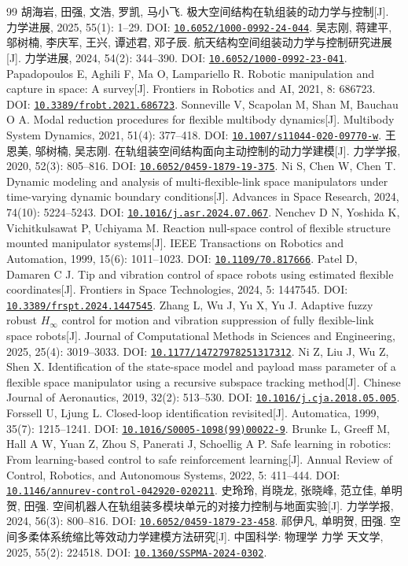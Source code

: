 \documentclass[UTF8,a4paper,zihao=-4,fontset=fandol]{ctexart}
\newcommand{\doi}[1]{\href{https://doi.org/#1}{\nolinkurl{#1}}}
\begin{document}
\begingroup
\small
{}
\renewcommand{\refname}{主要参考文献}
\begin{thebibliography}{99}
\setlength{\itemsep}{0.3em}
 胡海岩, 田强, 文浩, 罗凯, 马小飞. 极大空间结构在轨组装的动力学与控制[J]. 力学进展, 2025, 55(1): 1--29. DOI: \doi{10.6052/1000-0992-24-044}.
 吴志刚, 蒋建平, 邬树楠, 李庆军, 王兴, 谭述君, 邓子辰. 航天结构空间组装动力学与控制研究进展[J]. 力学进展, 2024, 54(2): 344--390. DOI: \doi{10.6052/1000-0992-23-041}.
 Papadopoulos E, Aghili F, Ma O, Lampariello R. Robotic manipulation and capture in space: A survey[J]. Frontiers in Robotics and AI, 2021, 8: 686723. DOI: \doi{10.3389/frobt.2021.686723}.
 Sonneville V, Scapolan M, Shan M, Bauchau O A. Modal reduction procedures for flexible multibody dynamics[J]. Multibody System Dynamics, 2021, 51(4): 377--418. DOI: \doi{10.1007/s11044-020-09770-w}.
 王恩美, 邬树楠, 吴志刚. 在轨组装空间结构面向主动控制的动力学建模[J]. 力学学报, 2020, 52(3): 805--816. DOI: \doi{10.6052/0459-1879-19-375}.
 Ni S, Chen W, Chen T. Dynamic modeling and analysis of multi-flexible-link space manipulators under time-varying dynamic boundary conditions[J]. Advances in Space Research, 2024, 74(10): 5224--5243. DOI: \doi{10.1016/j.asr.2024.07.067}.
 Nenchev D N, Yoshida K, Vichitkulsawat P, Uchiyama M. Reaction null-space control of flexible structure mounted manipulator systems[J]. IEEE Transactions on Robotics and Automation, 1999, 15(6): 1011--1023. DOI: \doi{10.1109/70.817666}.
 Patel D, Damaren C J. Tip and vibration control of space robots using estimated flexible coordinates[J]. Frontiers in Space Technologies, 2024, 5: 1447545. DOI: \doi{10.3389/frspt.2024.1447545}.
 Zhang L, Wu J, Yu X, Yu J. Adaptive fuzzy robust $H_\infty$ control for motion and vibration suppression of fully flexible-link space robots[J]. Journal of Computational Methods in Sciences and Engineering, 2025, 25(4): 3019--3033. DOI: \doi{10.1177/14727978251317312}.
 Ni Z, Liu J, Wu Z, Shen X. Identification of the state-space model and payload mass parameter of a flexible space manipulator using a recursive subspace tracking method[J]. Chinese Journal of Aeronautics, 2019, 32(2): 513--530. DOI: \doi{10.1016/j.cja.2018.05.005}.
 Forssell U, Ljung L. Closed-loop identification revisited[J]. Automatica, 1999, 35(7): 1215--1241. DOI: \doi{10.1016/S0005-1098(99)00022-9}.
 Brunke L, Greeff M, Hall A W, Yuan Z, Zhou S, Panerati J, Schoellig A P. Safe learning in robotics: From learning-based control to safe reinforcement learning[J]. Annual Review of Control, Robotics, and Autonomous Systems, 2022, 5: 411--444. DOI: \doi{10.1146/annurev-control-042920-020211}.
 史玲玲, 肖晓龙, 张晓峰, 范立佳, 单明贺, 田强. 空间机器人在轨组装多模块单元的对接力控制与地面实验[J]. 力学学报, 2024, 56(3): 800--816. DOI: \doi{10.6052/0459-1879-23-458}.
 祁伊凡, 单明贺, 田强. 空间多柔体系统缩比等效动力学建模方法研究[J]. 中国科学: 物理学 力学 天文学, 2025, 55(2): 224518. DOI: \doi{10.1360/SSPMA-2024-0302}.
\end{thebibliography}
\end{document}
